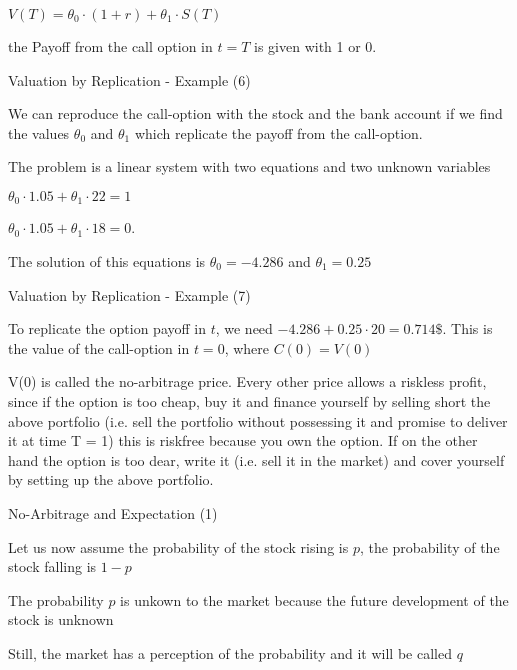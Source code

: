 	$V(T) = \theta_0 \cdot (1+r) + \theta_1 \cdot S(T)$

	the Payoff from the call option in $t=T$ is given with 1 or 0.

{Valuation by Replication - Example (6)}


	We can reproduce the call-option with the stock and the bank account if we find the values $\theta_0$ and $\theta_1$ which replicate the payoff from the call-option.

	The problem is a linear system with two equations and two unknown variables

	$\theta_0 \cdot 1.05 + \theta_1 \cdot 22 = 1$

	$\theta_0 \cdot 1.05 + \theta_1 \cdot 18 = 0$.

	The solution of this equations is $\theta_0 = -4.286$ and $\theta_1 = 0.25$


{Valuation by Replication - Example (7)}


	To replicate the option payoff in $t$, we need $-4.286+0.25 \cdot 20 = 0.714 \$$. This is the value of the call-option in $t=0$, where $C(0)=V(0)$

	V(0) is called the no-arbitrage price. Every other price allows a
riskless profit, since if the option is too cheap, buy it and
finance yourself by selling short the above portfolio (i.e. sell the
portfolio without possessing it and promise to deliver it at time
T = 1) this is riskfree because you own the option. If on the
other hand the option is too dear, write it (i.e. sell it in the
market) and cover yourself by setting up the above portfolio.


{No-Arbitrage and Expectation (1)}


	Let us now assume the probability of the stock rising is $p$, the probability of the stock falling is $1-p$

	The probability $p$ is unkown to the market because the future development of the stock is unknown
  \vspace{0.3cm}

	Still, the market has a perception of the probability and it will  be called $q$

